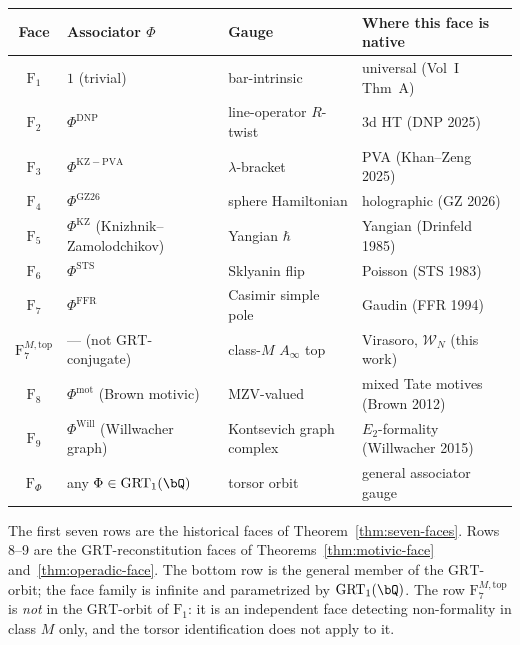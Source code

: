 \documentclass[11pt]{article}
\theoremstyle{plain}
\theoremstyle{definition}
\theoremstyle{remark}
\newcommand{\Walg}{\mathcal{W}}
\begin{document}
\begin{center}
\renewcommand{\arraystretch}{1.35}
\begin{tabular}{|c|l|l|l|}
\hline
\textbf{Face} & \textbf{Associator} $\Phi$
 & \textbf{Gauge}
 & \textbf{Where this face is native} \\
\hline\hline
$\mathrm{F}_1$ & $1$ (trivial)
 & bar-intrinsic
 & universal (Vol~I Thm~A) \\
\hline
$\mathrm{F}_2$ & $\Phi^{\mathrm{DNP}}$
 & line-operator $R$-twist
 & 3d HT (DNP 2025) \\
\hline
$\mathrm{F}_3$ & $\Phi^{\mathrm{KZ-PVA}}$
 & $\lambda$-bracket
 & PVA (Khan--Zeng 2025) \\
\hline
$\mathrm{F}_4$ & $\Phi^{\mathrm{GZ26}}$
 & sphere Hamiltonian
 & holographic (GZ 2026) \\
\hline
$\mathrm{F}_5$ & $\Phi^{\mathrm{KZ}}$ (Knizhnik--Zamolodchikov)
 & Yangian $\hbar$
 & Yangian (Drinfeld 1985) \\
\hline
$\mathrm{F}_6$ & $\Phi^{\mathrm{STS}}$
 & Sklyanin flip
 & Poisson (STS 1983) \\
\hline
$\mathrm{F}_7$ & $\Phi^{\mathrm{FFR}}$
 & Casimir simple pole
 & Gaudin (FFR 1994) \\
\hline
$\mathrm{F}_7^{M,\mathrm{top}}$ & --- (not $\mathrm{GRT}$-conjugate)
 & class-$M$ $A_\infty$ top
 & Virasoro, $\Walg_N$ (this work) \\
\hline
$\mathrm{F}_8$ & $\Phi^{\mathrm{mot}}$ (Brown motivic)
 & MZV-valued
 & mixed Tate motives (Brown 2012) \\
\hline
$\mathrm{F}_9$ & $\Phi^{\mathrm{Will}}$ (Willwacher graph)
 & Kontsevich graph complex
 & $E_2$-formality (Willwacher 2015) \\
\hline
$\mathrm{F}_\Phi$ & any $\Phi\in\mathrm{GRT}_1(\bQ)$
 & torsor orbit
 & general associator gauge \\
\hline
\end{tabular}
\end{center}
\label{tab:grt-representatives}

The first seven rows are the historical faces of
Theorem~\ref{thm:seven-faces}. Rows 8--9 are the
$\mathrm{GRT}$-reconstitution faces of
Theorems~\ref{thm:motivic-face} and~\ref{thm:operadic-face}. The
bottom row is the general member of the $\mathrm{GRT}$-orbit; the
face family is infinite and parametrized by $\mathrm{GRT}_1(\bQ)$.
The row $\mathrm{F}_7^{M,\mathrm{top}}$ is \emph{not} in the
$\mathrm{GRT}$-orbit of $\mathrm{F}_1$: it is an independent face
detecting non-formality in class $M$ only, and the torsor
identification does not apply to it.
\end{document}

